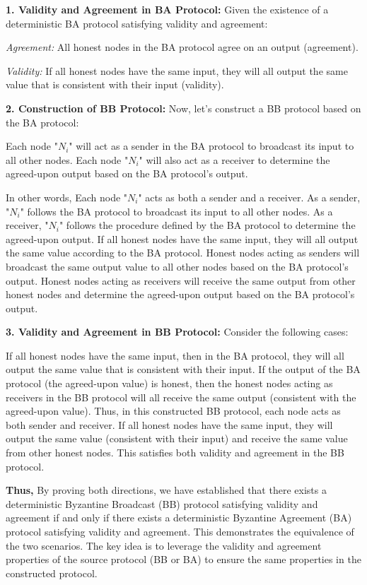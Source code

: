 \documentclass{article}
\begin{document}
\begin{enumerate}
\textbf{1. Validity and Agreement in BA Protocol:}
Given the existence of a deterministic BA protocol satisfying validity and agreement:

\emph{Agreement:} All honest nodes in the BA protocol agree on an output (agreement).

\emph{Validity:} If all honest nodes have the same input, they will all output the same value that is consistent with their input (validity).

\textbf{2. Construction of BB Protocol:}
Now, let's construct a BB protocol based on the BA protocol:

Each node "$N_i$" will act as a sender in the BA protocol to broadcast its input to all other nodes.
Each node "$N_i$" will also act as a receiver to determine the agreed-upon output based on the BA protocol's output.

In other words, Each node "$N_i$" acts as both a sender and a receiver.
As a sender, "$N_i$" follows the BA protocol to broadcast its input to all other nodes.
As a receiver, "$N_i$" follows the procedure defined by the BA protocol to determine the agreed-upon output.
If all honest nodes have the same input, they will all output the same value according to the BA protocol.
Honest nodes acting as senders will broadcast the same output value to all other nodes based on the BA protocol's output.
Honest nodes acting as receivers will receive the same output from other honest nodes and determine the agreed-upon output based on the BA protocol's output.

\textbf{3. Validity and Agreement in BB Protocol:}
Consider the following cases:

If all honest nodes have the same input, then in the BA protocol, they will all output the same value that is consistent with their input.
If the output of the BA protocol (the agreed-upon value) is honest, then the honest nodes acting as receivers in the BB protocol will all receive the same output (consistent with the agreed-upon value).
Thus, in this constructed BB protocol, each node acts as both sender and receiver. If all honest nodes have the same input, they will output the same value (consistent with their input) and receive the same value from other honest nodes. This satisfies both validity and agreement in the BB protocol.

\textbf{Thus,}
By proving both directions, we have established that there exists a deterministic Byzantine Broadcast (BB) protocol satisfying validity and agreement if and only if there exists a deterministic Byzantine Agreement (BA) protocol satisfying validity and agreement. This demonstrates the equivalence of the two scenarios. The key idea is to leverage the validity and agreement properties of the source protocol (BB or BA) to ensure the same properties in the constructed protocol.

\end{enumerate}
\end{document}
